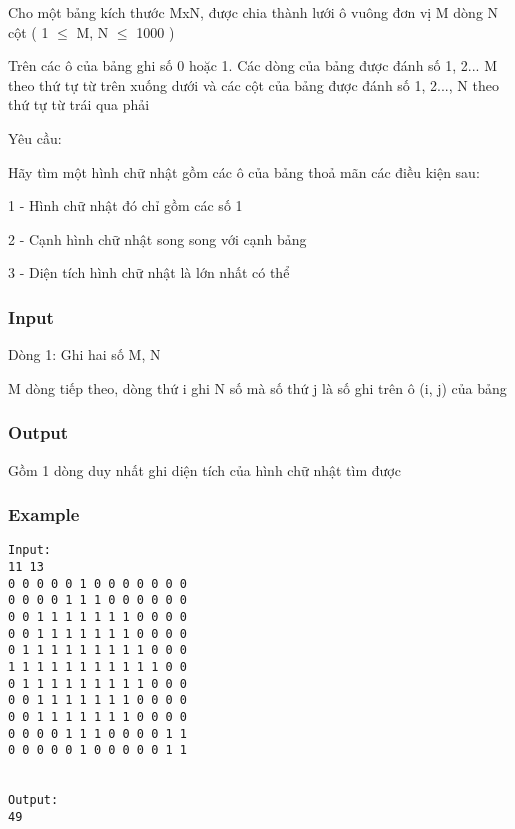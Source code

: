 



   Cho một bảng kích thước MxN, được chia thành lưới ô vuông đơn vị M dòng N cột ( 1  $\le$  M, N  $\le$  1000 )  

   Trên các ô của bảng ghi số 0 hoặc 1. Các dòng của bảng được đánh số 1, 2... M theo thứ tự từ trên xuống dưới và các cột của bảng được đánh số 1, 2..., N theo thứ tự từ trái qua phải  

   Yêu cầu:  

   Hãy tìm một hình chữ nhật gồm các ô của bảng thoả mãn các điều kiện sau:  

   1 - Hình chữ nhật đó chỉ gồm các số 1  

   2 - Cạnh hình chữ nhật song song với cạnh bảng  

   3 - Diện tích hình chữ nhật là lớn nhất có thể  

\subsubsection{   Input  }

   Dòng 1: Ghi hai số M, N  

   M dòng tiếp theo, dòng thứ i ghi N số mà số thứ j là số ghi trên ô (i, j) của bảng  

\subsubsection{   Output  }

   Gồm 1 dòng duy nhất ghi diện tích của hình chữ nhật tìm được  

\subsubsection{   Example  }
\begin{verbatim}
Input:
11 13
0 0 0 0 0 1 0 0 0 0 0 0 0
0 0 0 0 1 1 1 0 0 0 0 0 0
0 0 1 1 1 1 1 1 1 0 0 0 0
0 0 1 1 1 1 1 1 1 0 0 0 0
0 1 1 1 1 1 1 1 1 1 0 0 0
1 1 1 1 1 1 1 1 1 1 1 0 0
0 1 1 1 1 1 1 1 1 1 0 0 0
0 0 1 1 1 1 1 1 1 0 0 0 0
0 0 1 1 1 1 1 1 1 0 0 0 0
0 0 0 0 1 1 1 0 0 0 0 1 1
0 0 0 0 0 1 0 0 0 0 0 1 1


Output:
49
\end{verbatim}
